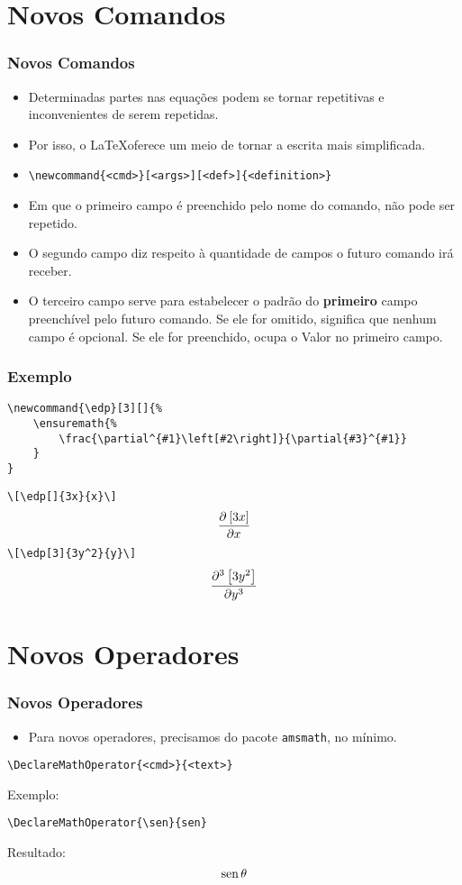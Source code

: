 \documentclass[brazilian]{beamer}
\begin{document}
\section{Novos Comandos}
\begin{frame}[fragile]
    \frametitle{Novos Comandos}

    \begin{itemize}
        \item Determinadas partes nas equações podem se tornar repetitivas e inconvenientes de serem repetidas. 
        \item Por isso, o \LaTeX oferece um meio de tornar a escrita mais simplificada.
        \item \lstinline[style=myStyleLatex]!\newcommand{<cmd>}[<args>][<def>]{<definition>}!
        \item Em que o primeiro campo é preenchido pelo nome do comando, não pode ser repetido.
        \item O segundo campo diz respeito à quantidade de campos o futuro comando irá receber. 
        \item O terceiro campo serve para estabelecer o padrão do \textbf{primeiro} campo preenchível pelo futuro comando. Se ele for omitido, significa que nenhum campo é opcional. Se ele for preenchido, ocupa o Valor no primeiro campo. 
    \end{itemize}

\end{frame}
\begin{frame}[fragile]
    \frametitle{Exemplo}
\footnotesize
\begin{lstlisting}[style=myStyleLatex]
\newcommand{\edp}[3][]{%
    \ensuremath{%
        \frac{\partial^{#1}\left[#2\right]}{\partial{#3}^{#1}}
    }
}
\end{lstlisting}
\lstinline[style=myStyleLatex]!\[\edp[]{3x}{x}\]!
\[\edp[]{3x}{x}\]
\lstinline[style=myStyleLatex]!\[\edp[3]{3y^2}{y}\]!
\[\edp[3]{3y^2}{y}\]

\end{frame}


\section{Novos Operadores}
\begin{frame}[fragile]
    \frametitle{Novos Operadores}

    \begin{itemize}
        \item Para novos operadores, precisamos do pacote \texttt{amsmath}, no mínimo.
    \end{itemize}
\begin{lstlisting}[style=myStyleLatex]
\DeclareMathOperator{<cmd>}{<text>}
\end{lstlisting}

Exemplo: 
\begin{lstlisting}[style=myStyleLatex]
\DeclareMathOperator{\sen}{sen}
\end{lstlisting}

Resultado: \[\sen\theta\]


\end{frame}
\end{document}
